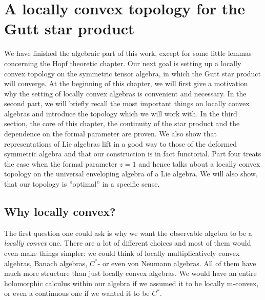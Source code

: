 
%
%

\chapter{A locally convex topology for the Gutt star product}

We have finished the algebraic part of this work, except for some little 
lemmas concerning the Hopf theoretic chapter. Our next goal is setting up a 
locally convex topology on the symmetric tensor algebra, in which the Gutt 
star product will converge. At the beginning of this chapter, we will 
first give a motivation why the setting of locally convex algebras is 
convenient and necessary. In the second part, we will briefly recall the most 
important things on locally convex algebras and introduce the topology which 
we will work with. In the third section, the core of this chapter, the 
continuity of the star product and the dependence on the formal parameter are 
proven. We also show that representations of Lie algebras lift in a good way 
to  those of the deformed symmetric algebra and that our construction is in 
fact functorial. Part four treats the case when the formal parameter $z = 1$ 
and hence talks about a locally convex topology on the universal enveloping 
algebra of a Lie algebra. We will also show, that our topology is ''optimal'' 
in a specific sense.



\section{Why locally convex?}
\label{sec:chap5_Prelim}

The first question one could ask is why we want the observable algebra 
to be a \textit{locally convex} one. There are a lot of different choices 
and most of them would even make things simpler: we could think of 
locally multiplicatively convex algebras, Banach algebras, $C^*$- or even 
von Neumann algebras. All of them have much more structure than just 
locally convex algebras. We would have an entire holomorphic calculus 
within our algebra if we assumed it to be locally m-convex, or even a 
continuous one if we wanted it to be $C^*$.


